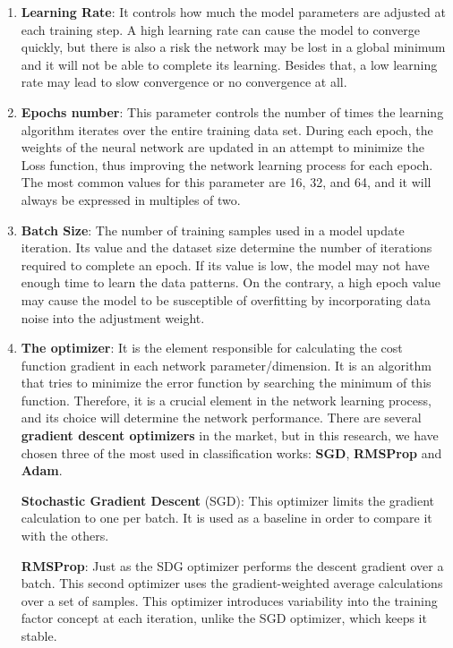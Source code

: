 \begin{enumerate}
    \item \textbf{Learning Rate}: It controls how much the model parameters are adjusted at each training step. A high learning rate can cause the model to converge quickly, but there is also a risk the network may be lost in a global minimum and it will not be able to complete its learning. Besides that, a low learning rate may lead to slow convergence or no convergence at all.

    \item \textbf{Epochs number}: This parameter controls the number of times the learning algorithm iterates over the entire training data set. During each epoch, the weights of the neural network are updated in an attempt to minimize the Loss function, thus improving the network learning process for each epoch. The most common values for this parameter are 16, 32, and 64, and it will always be expressed in multiples of two.

    \item \textbf{Batch Size}: The number of training samples used in a model update iteration. Its value and the dataset size determine the number of iterations required to complete an epoch. If its value is low, the model may not have enough time to learn the data patterns. On the contrary, a high epoch value may cause the model to be susceptible of overfitting by incorporating data noise into the adjustment weight.

    \item \textbf{The optimizer}: It is the element responsible for calculating the cost function gradient in each network parameter/dimension. It is an algorithm that tries to minimize the error function by searching the minimum of this function. Therefore, it is a crucial element in the network learning process, and its choice will determine the network performance. There are several \textbf{gradient descent optimizers} in the market, but in this research, we have chosen three of the most used in classification works: \textbf{SGD}, \textbf{RMSProp} and \textbf{Adam}.

    \textbf{Stochastic Gradient Descent} (SGD): This optimizer limits the gradient calculation to one per batch. It is used as a baseline in order to compare it with the others.

    \textbf{RMSProp}: Just as the SDG optimizer performs the descent gradient over a batch. This second optimizer uses the gradient-weighted average calculations over a set of samples.  This optimizer introduces variability into the training factor concept at each iteration, unlike the SGD optimizer, which keeps it stable.


\end{enumerate}

